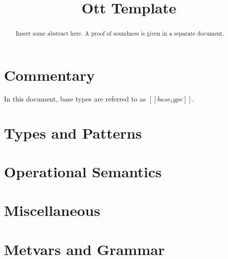 \documentclass[11pt]{article}%
\title{\vspace{-2cm}Ott Template}
\author{}
\date{}
\begin{document}
\maketitle%

\vspace{-2cm}
\begin{abstract}
Insert some abstract here.
A proof of soundness is given in a separate document.
\end{abstract}

{\let\clearpage\relax \tableofcontents}

\section{Commentary}
\label{sec:commentary}

In this document, base types are referred to as $[[ base_type ]]$.

\raggedright%

\section{Types and Patterns}
\ottdefnstyXXjudge%

\section{Operational Semantics}
\ottdefnsopsemXXjudge%

\section{Miscellaneous}
\ottdefnsproofXXdefns%

\section{Metvars and Grammar}
\ottmetavars\\[\baselineskip]
\ottgrammar%
\end{document}
